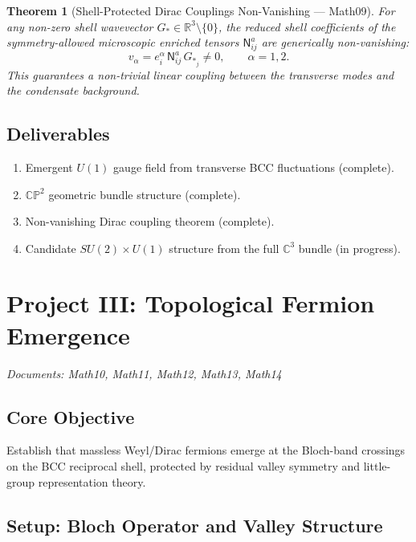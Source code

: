 \documentclass[reprint,aps,pre,onecolumn,superscriptaddress,amsmath,amssymb]{revtex4-2}
\newcommand{\Gstar}{G_{*}}
\newtheorem{theorem}{Theorem}[section]
\begin{document}
\begin{theorem}[Shell-Protected Dirac Couplings Non-Vanishing --- Math09]
  \label{thm:Dirac-coupling}
  For any non-zero shell wavevector $\Gstar \in \mathbb{R}^{3}\setminus\{0\}$,
  the reduced shell coefficients of the symmetry-allowed microscopic enriched
  tensors $\mathsf{N}_{ij}^{a}$ are generically non-vanishing:
  \begin{equation}
    v_{\alpha} = e_{i}^{\alpha}\,\mathsf{N}_{ij}^{a}\,\Gstar_{j} \neq 0,
    \qquad \alpha = 1, 2.
    \label{eq:shell-coupling}
  \end{equation}
  This guarantees a non-trivial linear coupling between the
  transverse modes and the condensate background.
\end{theorem}

\subsection{Deliverables}
\begin{enumerate}
  \item Emergent $U(1)$ gauge field from transverse BCC fluctuations (complete).
  \item $\mathbb{CP}^{2}$ geometric bundle structure (complete).
  \item Non-vanishing Dirac coupling theorem (complete).
  \item Candidate $SU(2)\times U(1)$ structure from the full $\mathbb{C}^{3}$ bundle (in progress).
\end{enumerate}

\section{Project III: Topological Fermion Emergence}
\label{sec:proj3}
\textit{Documents: Math10, Math11, Math12, Math13, Math14}

\subsection{Core Objective}

Establish that massless Weyl/Dirac fermions emerge at the Bloch-band crossings
on the BCC reciprocal shell, protected by residual valley symmetry and little-group
representation theory.

\subsection{Setup: Bloch Operator and Valley Structure}
\end{document}
